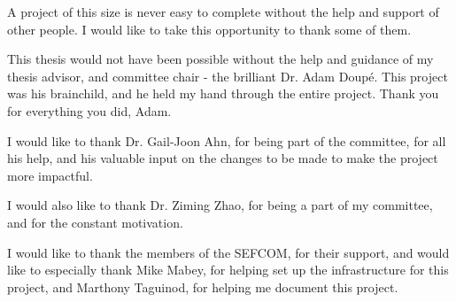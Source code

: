 A project of this size is never easy to complete without the help and support of other people. I would like to take this opportunity to thank some of them.

This thesis would not have been possible without the help and guidance of my thesis advisor, and committee chair - the brilliant Dr. Adam Doup\'{e}.
This project was his brainchild, and he held my hand through the entire project. Thank you for everything you did, Adam.

I would like to thank Dr. Gail-Joon Ahn, for being part of the committee, for all his help, and his valuable input on the changes to be made to make the project more impactful.

I would also like to thank Dr. Ziming Zhao, for being a part of my committee, and for the constant motivation.

I would like to thank the members of the SEFCOM, for their support, and would like to especially thank Mike Mabey, for helping set up the infrastructure for this project, and Marthony Taguinod, for helping me document this project.
